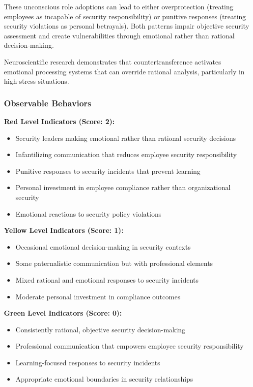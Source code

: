 \documentclass[11pt,a4paper]{article}
\begin{document}
These unconscious role adoptions can lead to either overprotection (treating employees as incapable of security responsibility) or punitive responses (treating security violations as personal betrayals). Both patterns impair objective security assessment and create vulnerabilities through emotional rather than rational decision-making.

Neuroscientific research demonstrates that countertransference activates emotional processing systems that can override rational analysis, particularly in high-stress situations\cite{decety2011}.

\subsubsection{Observable Behaviors}

\textbf{Red Level Indicators (Score: 2):}
\begin{itemize}
\item Security leaders making emotional rather than rational security decisions
\item Infantilizing communication that reduces employee security responsibility
\item Punitive responses to security incidents that prevent learning
\item Personal investment in employee compliance rather than organizational security
\item Emotional reactions to security policy violations
\end{itemize}

\textbf{Yellow Level Indicators (Score: 1):}
\begin{itemize}
\item Occasional emotional decision-making in security contexts
\item Some paternalistic communication but with professional elements
\item Mixed rational and emotional responses to security incidents
\item Moderate personal investment in compliance outcomes
\end{itemize}

\textbf{Green Level Indicators (Score: 0):}
\begin{itemize}
\item Consistently rational, objective security decision-making
\item Professional communication that empowers employee security responsibility
\item Learning-focused responses to security incidents
\item Appropriate emotional boundaries in security relationships
\end{itemize}
\end{document}
